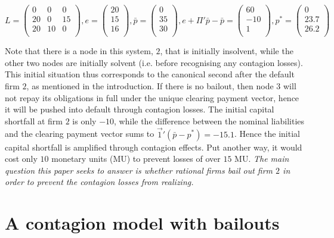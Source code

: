 \documentclass[12pt,a4paper]{article}
\begin{document}
\[ L=
\begin{pmatrix}
 0 &  0 &  0 \\
20 &  0 & 15 \\
20 & 10 &  0 \\
\end{pmatrix}, e =
\begin{pmatrix}
20 \\
15 \\
16 \\
\end{pmatrix}, \bar{p} = 
\begin{pmatrix}
 0 \\
35 \\
30 \\
\end{pmatrix}, e+\Pi' \bar{p}-\bar{p} = 
\begin{pmatrix}
 60 \\
-10 \\
  1 \\
\end{pmatrix}, p^* = 
\begin{pmatrix}
 0 \\
23.7 \\
26.2 \\
\end{pmatrix}
\]

Note that there is a node in this system, $2$, that is initially insolvent, while the other two nodes are initially solvent (i.e. before recognising any contagion losses). This initial situation thus corresponds to the canonical second after the default firm $2$, as mentioned in the introduction. If there is no bailout, then node $3$ will not repay its obligations in full under the unique clearing payment vector, hence it will be pushed into default through contagion losses. The initial capital shortfall at firm $2$ is only $-10$, while the difference between the nominal liabilities and the clearing payment vector sums to $\vec{1}'(\bar{p}-p^*)=-15.1$. Hence the initial capital shortfall is amplified through contagion effects. Put another way, it would cost only $10$ monetary units (MU) to prevent losses of over $15$ MU. \textit{The main question this paper seeks to answer is whether rational firms bail out firm $2$ in order to prevent the contagion losses from realizing.}

\section{A contagion model with bailouts}
\label{sec:bailoutmodel}
\end{document}
